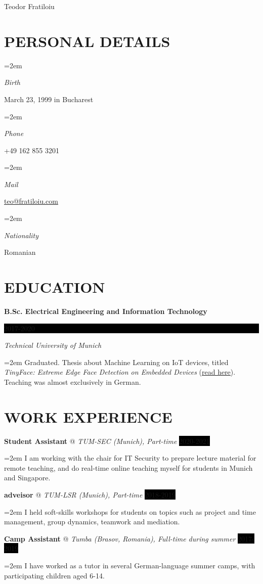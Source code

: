 \documentclass[paper=a4,fontsize=11pt]{scrartcl}
\makeatletter
\newlength{\spacebox}
\newcommand{\sepspace}{\vspace*{1em}}		%
\newcommand{\MyName}[1]{ %
		\Huge \usefont{OT1}{phv}{b}{n} \hfill #1
		\par \normalsize \normalfont}
\newcommand{\MySlogan}[1]{ %
		\large \usefont{OT1}{phv}{m}{n}\hfill \textit{#1}
		\par \normalsize \normalfont}
\newcommand{\NewPart}[1]{\section*{\uppercase{#1}}}
\newcommand{\PersonalEntry}[2]{
		\noindent\hangindent=2em\hangafter=0 %
		\parbox{\spacebox}{        %
		\textit{#1}}		       %
		\hspace{1.5em} #2 \par}    %
\newcommand{\EducationEntry}[4]{
		\noindent \textbf{#1} \hfill      %
		\colorbox{Black}{%
			\parbox{6em}{%
			\hfill\color{White}#2}} \par  %
		\noindent \textit{#3} \par        %
		\noindent\hangindent=2em\hangafter=0 \small #4 %
		\normalsize \par}
\newcommand{\WorkEntry}[4]{				  %
		\noindent \textbf{#1} @ \textit{#3} \hfill      %
		\colorbox{Black}{\color{White}#2} \par  %
		\noindent\hangindent=2em\hangafter=0 \small #4 %
		\normalsize \par}
\makeatother
\begin{document}

\MyName{Teodor Fratiloiu}

\sepspace

\NewPart{Personal details}{}

\PersonalEntry{Birth}{March 23, 1999 in Bucharest}
\PersonalEntry{Phone}{+49 162 855 3201}
\PersonalEntry{Mail}{\url{teo@fratiloiu.com}}
\PersonalEntry{Nationality}{Romanian}

\NewPart{Education}{}

\sepspace

\EducationEntry{B.Sc. Electrical Engineering and Information Technology}{2017-2020}{Technical University of Munich}{Graduated. Thesis about Machine Learning on IoT devices, titled \textit{TinyFace: Extreme Edge Face Detection on Embedded Devices} (\href{https://github.com/munober/thesis/blob/master/digital_edition.pdf}{\underline{read here}}). Teaching was almost exclusively in German.}

\NewPart{Work experience}{}

\WorkEntry{Student Assistant}{2020-2021}{TUM-SEC (Munich), Part-time}{I am working with the chair for IT Security to prepare lecture material for remote teaching, and do real-time online teaching myself for students in Munich and Singapore.}
\sepspace

\WorkEntry{adveisor}{2018-2019}{TUM-LSR (Munich), Part-time}{I held soft-skills workshops for students on topics such as project and time management, group dynamics, teamwork and mediation.}
\sepspace

\WorkEntry{Camp Assistant}{2017-2019}{Tumba (Brasov, Romania), Full-time during summer}{ I have worked as a tutor in several German-language summer camps, with participating children aged 6-14.}
\sepspace
\end{document}
